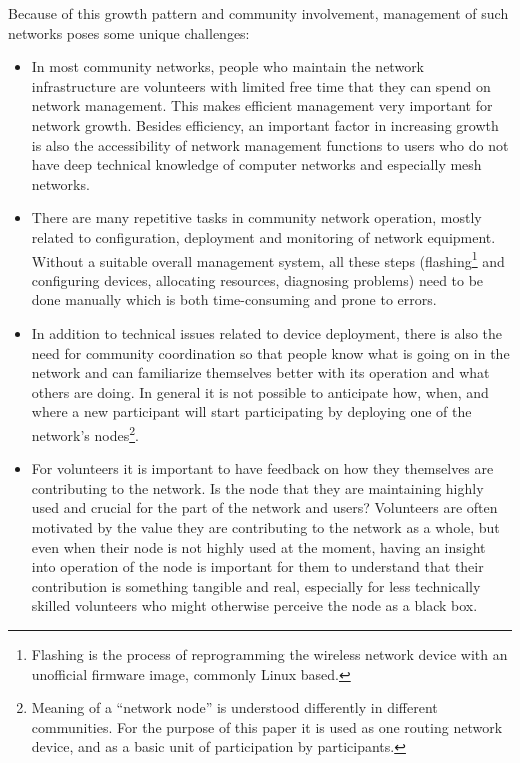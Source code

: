 \documentclass[5p,sort&compress]{elsarticle}
\begin{document}
Because of this growth pattern and community involvement, management of such networks poses some unique challenges:

\begin{itemize}
\item In most community networks, people who maintain the network infrastructure are volunteers with limited free time that they can spend on network management.
This makes efficient management very important for network growth.
Besides efficiency, an important factor in increasing growth is also the accessibility of network management functions to users who do not have deep technical knowledge of computer networks and especially mesh networks.

\item There are many repetitive tasks in community network operation, mostly related to configuration, deployment and monitoring of network equipment.
Without a suitable overall management system, all these steps (flashing\footnote{Flashing is the process of reprogramming the wireless network device with an unofficial firmware image, commonly Linux based.} and configuring devices, allocating resources, diagnosing problems) need to be done manually which is both time-consuming and prone to errors.

\item In addition to technical issues related to device deployment, there is also the need for community coordination so that people know what is going on in the network and can familiarize themselves better with its operation and what others are doing.
In general it is not possible to anticipate how, when, and where a new participant will start participating by deploying one of the network's nodes\footnote{Meaning of a ``network node'' is understood differently in different communities. For the purpose of this paper it is used as one routing network device, and as a basic unit of participation by participants.}.

\item For volunteers it is important to have feedback on how they themselves are contributing to the network.
Is the node that they are maintaining highly used and crucial for the part of the network and users?
Volunteers are often motivated by the value they are contributing to the network as a whole, but even when their node is not highly used at the moment, having an insight into operation of the node is important for them to understand that their contribution is something tangible and real, especially for less technically skilled volunteers who might otherwise perceive the node as a black box.
\end{itemize}
\end{document}
